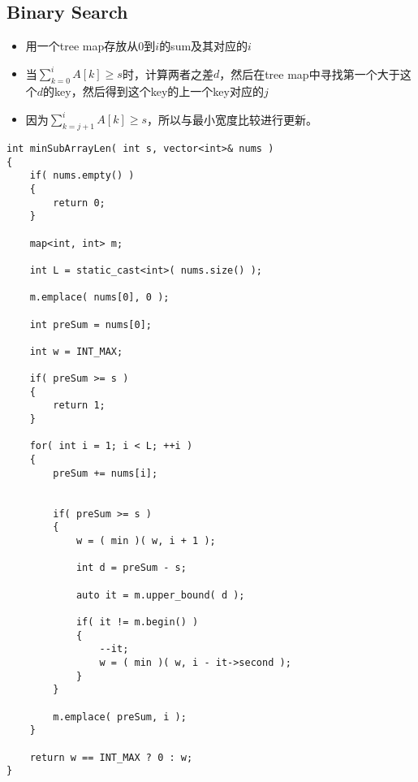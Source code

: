 \subsection{Binary Search}
\begin{itemize}
\item 用一个tree map存放从0到$i$的sum及其对应的$i$
\item 当$\sum\limits_{k=0}^iA[k] \geq s$时，计算两者之差$d$，然后在tree map中寻找第一个大于这个$d$的key，然后得到这个key的上一个key对应的$j$
\item 因为$\sum\limits_{k=j+1}^iA[k] \geq s$，所以与最小宽度比较进行更新。
\end{itemize}
\begin{lstlisting}[style=customc, caption={Binary Search}]
int minSubArrayLen( int s, vector<int>& nums )
{
    if( nums.empty() )
    {
        return 0;
    }

    map<int, int> m;

    int L = static_cast<int>( nums.size() );

    m.emplace( nums[0], 0 );

    int preSum = nums[0];

    int w = INT_MAX;

    if( preSum >= s )
    {
        return 1;
    }

    for( int i = 1; i < L; ++i )
    {
        preSum += nums[i];


        if( preSum >= s )
        {
            w = ( min )( w, i + 1 );

            int d = preSum - s;

            auto it = m.upper_bound( d );

            if( it != m.begin() )
            {
                --it;
                w = ( min )( w, i - it->second );
            }
        }

        m.emplace( preSum, i );
    }

    return w == INT_MAX ? 0 : w;
}
\end{lstlisting}